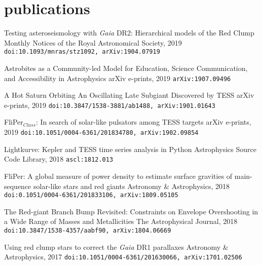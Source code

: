 \documentclass[]{k-cv} %
\begin{document}
\clearpage
{}


\section{publications}
{Testing asteroseismology with \textit{Gaia} DR2: Hierarchical models of the Red Clump}
{Monthly Notices of the Royal Astronomical Society, 2019}
{\texttt{doi:10.1093/mnras/stz1092, arXiv:1904.07919}}

{Astrobites as a Community-led Model for Education, Science Communication, and Accessibility in Astrophysics}
{arXiv e-prints, 2019}
{\texttt{arXiv:1907.09496}}

{{A Hot Saturn Orbiting An Oscillating Late Subgiant Discovered by TESS}}
{arXiv e-prints, 2019}
{\texttt{doi:10.3847/1538-3881/ab1488, arXiv:1901.01643}}

{FliPer$_{Class}$: In search of solar-like pulsators among TESS targets}
{arXiv e-prints, 2019}
{\texttt{doi:10.1051/0004-6361/201834780, arXiv:1902.09854}}

{Lightkurve: Kepler and TESS time series analysis in Python}
{Astrophysics Source Code Library, 2018}
{\texttt{ascl:1812.013}}

{FliPer: A global measure of power density to estimate surface gravities of main-sequence solar-like stars and red giants}
{Astronomy \& Astrophysics, 2018}
{\texttt{doi:0.1051/0004-6361/201833106, arXiv:1809.05105}}

{The Red-giant Branch Bump Revisited: Constraints on Envelope Overshooting in a Wide Range of Masses and Metallicities}
{The Astrophysical Journal, 2018}
{\texttt{doi:10.3847/1538-4357/aabf90, arXiv:1804.06669}}

{Using red clump stars to correct the \emph{Gaia} DR1 parallaxes}
{Astronomy \& Astrophysics, 2017}
{\texttt{doi:10.1051/0004-6361/201630066, arXiv:1701.02506}}
\end{document}
